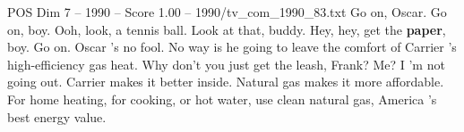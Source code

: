 \begin{textsample}{POS Dim 7 – 1990 – Score 1.00 – 1990/tv\_com\_1990\_83.txt}  \label{ex:f7_pos_063}
Go on, Oscar.
Go on, boy.
Ooh, look, a tennis ball.
Look at that, buddy.
Hey, hey, get the \textbf{paper}, boy.
Go on.
Oscar 's no fool.
No way is he going to leave the comfort of Carrier 's high-efficiency gas heat.
Why don't you just get the leash, Frank?
Me?
I 'm not going out.
Carrier makes it better inside.
Natural gas makes it more affordable.
For home heating, for cooking, or hot water, use clean natural gas, America 's best energy value.

\end{textsample}
